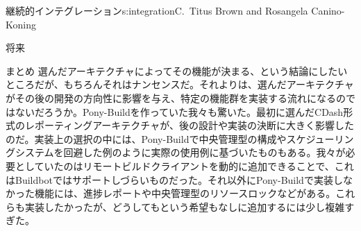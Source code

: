 \begin{aosachapter}{継続的インテグレーション}{s:integration}{C.\ Titus Brown and Rosangela Canino-Koning}
\begin{aosasect1}{将来}
\begin{aosasect2}{まとめ}
選んだアーキテクチャによってその機能が決まる、という結論にしたいところだが、もちろんそれはナンセンスだ。それよりは、選んだアーキテクチャがその後の開発の方向性に影響を与え、特定の機能群を実装する流れになるのではないだろうか。Pony-Buildを作っていた我々も驚いた。最初に選んだCDash形式のレポーティングアーキテクチャが、後の設計や実装の決断に大きく影響したのだ。実装上の選択の中には、Pony-Buildで中央管理型の構成やスケジューリングシステムを回避した例のように実際の使用例に基づいたものもある。我々が必要としていたのはリモートビルドクライアントを動的に追加できることで、これはBuildbotではサポートしづらいものだった。それ以外にPony-Buildで実装しなかった機能には、進捗レポートや中央管理型のリソースロックなどがある。これらも実装したかったが、どうしてもという希望もなしに追加するには少し複雑すぎた。


\end{aosasect2}
\end{aosasect1}
\end{aosachapter}
